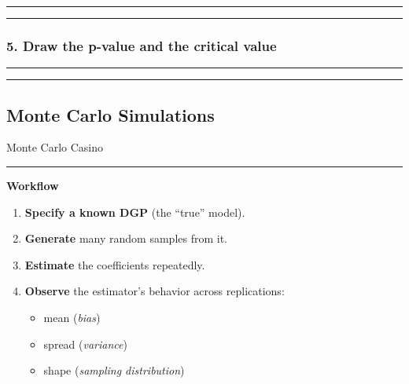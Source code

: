 \documentclass[
  letterpaper,
  DIV=11,
  numbers=noendperiod]{scrartcl}
\providecommand{\tightlist}{%
  \setlength{\itemsep}{0pt}\setlength{\parskip}{0pt}}
\begin{document}
\begin{center}\rule{0.5\linewidth}{0.5pt}\end{center}

\begin{center}\rule{0.5\linewidth}{0.5pt}\end{center}

\subsubsection{5. Draw the p-value and the critical
value}\label{draw-the-p-value-and-the-critical-value-1}

\begin{center}\rule{0.5\linewidth}{0.5pt}\end{center}

\begin{center}\rule{0.5\linewidth}{0.5pt}\end{center}

\subsection{Monte Carlo Simulations}\label{monte-carlo-simulations}

Monte Carlo Casino

\begin{center}\rule{0.5\linewidth}{0.5pt}\end{center}

\begin{tcolorbox}[enhanced jigsaw, rightrule=.15mm, leftrule=.75mm, colback=white, left=2mm, colframe=quarto-callout-tip-color-frame, coltitle=black, opacitybacktitle=0.6, bottomrule=.15mm, toprule=.15mm, colbacktitle=quarto-callout-tip-color!10!white, breakable, titlerule=0mm, opacityback=0, toptitle=1mm, bottomtitle=1mm, title=\textcolor{quarto-callout-tip-color}{\faLightbulb}\hspace{0.5em}{Monte Carlo: a lab for estimators}, arc=.35mm]

\textbf{Workflow}

\begin{enumerate}
\def\labelenumi{\arabic{enumi}.}
\tightlist
\item
  \textbf{Specify a known DGP} (the ``true'' model).
\item
  \textbf{Generate} many random samples from it.
\item
  \textbf{Estimate} the coefficients repeatedly.
\item
  \textbf{Observe} the estimator's behavior across replications:

  \begin{itemize}
  \tightlist
  \item
    mean (\emph{bias})
  \item
    spread (\emph{variance})
  \item
    shape (\emph{sampling distribution})
  \end{itemize}
\end{enumerate}

\end{tcolorbox}
\end{document}
